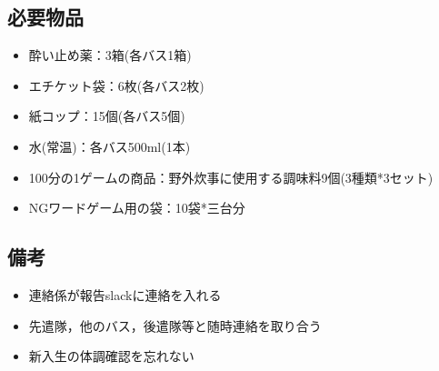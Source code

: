 \subsection{必要物品}
\begin{itemize}
\item 酔い止め薬：3箱(各バス1箱)
\item エチケット袋：6枚(各バス2枚)
\item 紙コップ：15個(各バス5個)
\item 水(常温)：各バス500ml(1本)
\item 100分の1ゲームの商品：野外炊事に使用する調味料9個(3種類*3セット)
  \item NGワードゲーム用の袋：10袋*三台分
\end{itemize}

\subsection{備考}

\begin{itemize}
\item 連絡係が報告slackに連絡を入れる
\item 先遣隊，他のバス，後遣隊等と随時連絡を取り合う
\item 新入生の体調確認を忘れない
\end{itemize}


